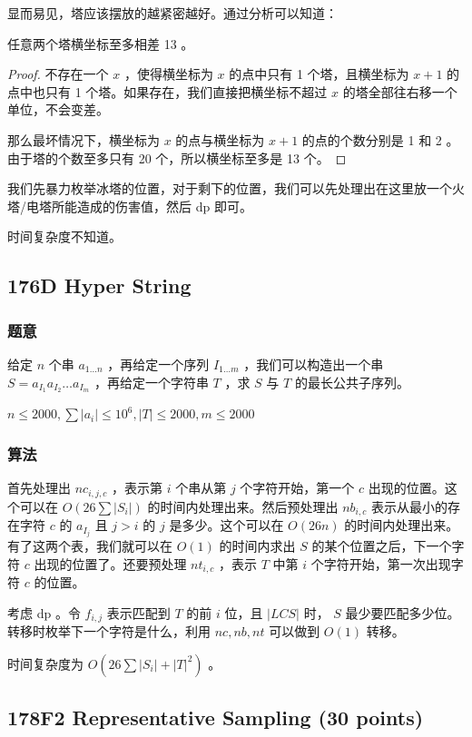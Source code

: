 \documentclass[11pt]{article}
\begin{document}
    显而易见，塔应该摆放的越紧密越好。通过分析可以知道：
\begin{theorem}
  任意两个塔横坐标至多相差 13 。
\end{theorem}
\begin{proof}
  不存在一个 $x$ ，使得横坐标为 $x$ 的点中只有 1 个塔，且横坐标为 $x + 1$ 的点中也只有 1 个塔。如果存在，我们直接把横坐标不超过 $x$ 的塔全部往右移一个单位，不会变差。

  那么最坏情况下，横坐标为 $x$ 的点与横坐标为 $x + 1$ 的点的个数分别是 1 和 2 。由于塔的个数至多只有 20 个，所以横坐标至多是 13 个。
\end{proof}

    我们先暴力枚举冰塔的位置，对于剩下的位置，我们可以先处理出在这里放一个火塔/电塔所能造成的伤害值，然后 dp 即可。

    时间复杂度不知道。
\subsection{176D  Hyper String}
\label{sec-10-4}
\subsubsection{题意}
\label{sec-10-4-1}

    给定 $n$ 个串 $a_{1 \dots n}$ ，再给定一个序列 $I_{1 \dots m}$ ，我们可以构造出一个串 $S = a_{I_1} a_{I_2} \dots a_{I_m}$ ，再给定一个字符串 $T$ ，求 $S$ 与 $T$ 的最长公共子序列。

    $n \leq 2000, \sum |a_i| \leq 10^6, |T| \leq 2000, m \leq 2000$
\subsubsection{算法}
\label{sec-10-4-2}

    首先处理出 $nc_{i, j, c}$ ，表示第 $i$ 个串从第 $j$ 个字符开始，第一个 $c$ 出现的位置。这个可以在 $O(26 \sum |S_i|)$ 的时间内处理出来。然后预处理出 $nb_{i, c}$ 表示从最小的存在字符 $c$ 的 $a_{I_j}$ 且 $j > i$ 的 $j$ 是多少。这个可以在 $O(26 n)$ 的时间内处理出来。有了这两个表，我们就可以在 $O(1)$ 的时间内求出 $S$ 的某个位置之后，下一个字符 $c$ 出现的位置了。还要预处理 $nt_{i, c}$ ，表示 $T$ 中第 $i$ 个字符开始，第一次出现字符 $c$ 的位置。

    考虑 dp 。令 $f_{i, j}$ 表示匹配到 $T$ 的前 $i$ 位，且 $|LCS|$ 时， $S$ 最少要匹配多少位。转移时枚举下一个字符是什么，利用 $nc, nb, nt$ 可以做到 $O(1)$ 转移。

    时间复杂度为 $O(26 \sum |S_i| + |T|^2)$ 。
\subsection{178F2 Representative Sampling (30 points)}
\label{sec-10-5}
\end{document}
